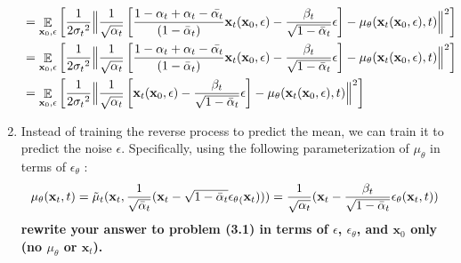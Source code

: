 \documentclass{article}
\DeclareMathOperator{\EX}{\mathbb{E}}%
\begin{document}
\begin{enumerate}
{\begin{align*}
    &= \EX_{\textbf{x}_0, \epsilon}\left[\frac{1}{2{\sigma_t}^2}
    \Big\lVert \frac{1}{\sqrt{\alpha_t}}\left[\frac{1 - \alpha_t + \alpha_t - \Bar{\alpha_t}}{(1 - \Bar{\alpha}_t)}\textbf{x}_t(\textbf{x}_0, \epsilon) - \frac{\beta_t}{\sqrt{1 - \Bar{\alpha}_t}}\epsilon\right] - {\mu_\theta}(\textbf{x}_t(\textbf{x}_0, \epsilon), t)\Big\rVert^2\right]\\
    &= \EX_{\textbf{x}_0, \epsilon}\left[\frac{1}{2{\sigma_t}^2}
    \Big\lVert \frac{1}{\sqrt{\alpha_t}}\left[\frac{1 - \alpha_t + \alpha_t - \Bar{\alpha_t}}{(1 - \Bar{\alpha}_t)}\textbf{x}_t(\textbf{x}_0, \epsilon) - \frac{\beta_t}{\sqrt{1 - \Bar{\alpha}_t}}\epsilon\right] - {\mu_\theta}(\textbf{x}_t(\textbf{x}_0, \epsilon), t)\Big\rVert^2\right]\\
    &= \EX_{\textbf{x}_0, \epsilon}\left[\frac{1}{2{\sigma_t}^2}
    \Big\lVert \frac{1}{\sqrt{\alpha_t}}\left[\textbf{x}_t(\textbf{x}_0, \epsilon) - \frac{\beta_t}{\sqrt{1 - \Bar{\alpha}_t}}\epsilon\right] - {\mu_\theta}(\textbf{x}_t(\textbf{x}_0, \epsilon), t)\Big\rVert^2\right]\\
    \end{align*}
}
    \item 
    Instead of training the reverse process to predict the mean, we can train it to predict the noise $\epsilon$. Specifically, using the following parameterization of $\mu_\theta$ in terms of $\epsilon_\theta$ :
    \begin{equation}
        {\mu_\theta}(\textbf{x}_t, t) = {{\Tilde\mu}_t}(\textbf{x}_t, \frac{1}{\sqrt{{\bar\alpha}_t}}(\textbf{x}_t - \sqrt{1 - {\bar\alpha}_t}{\epsilon_\theta}_(\textbf{x}_t))) = \frac{1}{\sqrt{\alpha_t}}(\textbf{x}_t - \frac{\beta_t}{\sqrt{1 - {\bar\alpha}_t}}{\epsilon_\theta}(\textbf{x}_t, t))
    \end{equation}
    \textbf{rewrite your answer to problem (3.1) in terms of  $\epsilon$, $\epsilon_\theta$, and $\textbf{x}_0$ only (no $\mu_\theta$ or $\textbf{x}_t$).}


\end{enumerate}
\end{document}

